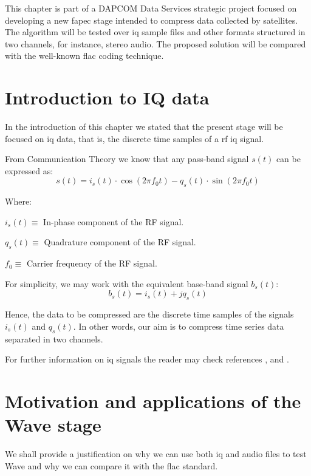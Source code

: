 This chapter is part of a DAPCOM Data Services strategic project focused on developing a new \acrshort{fapec} stage intended to compress data collected by satellites. The algorithm will be tested over \acrshort{iq} sample files and other formats structured in two channels, for instance, stereo audio. The proposed solution will be compared with the well-known \acrshort{flac} coding technique.

\section{Introduction to IQ data} \label{sec:iq_data}
In the introduction of this chapter we stated that the present stage will be focused on \acrshort{iq} data, that is, the discrete time samples of a \acrshort{rf} \acrshort{iq} signal.

From Communication Theory we know that any pass-band signal $s(t)$ can be expressed as:
\begin{equation}
s(t) = i_s(t) \cdot \cos(2\pi f_0 t) - q_s(t) \cdot \sin(2\pi f_0 t)
\end{equation}

Where:
\begin{description}
	\item $i_s(t) \equiv$ In-phase component of the RF signal.
	\item $q_s(t) \equiv$ Quadrature component of the RF signal.
	\item $f_0 \equiv$ Carrier frequency of the RF signal.
\end{description}

For simplicity, we may work with the equivalent base-band signal $b_s(t)$:
\begin{equation}
	b_s(t) = i_s(t) + j q_s(t)
\end{equation}

Hence, the data to be compressed are the discrete time samples of the signals $i_s(t)$ and $q_s(t)$. In other words, our aim is to compress time series data separated in two channels.

For further information on \acrshort{iq} signals the reader may check references \parencite{IQintro}, \parencite{carlson2010communication} and \parencite{ICOM}.

\section{Motivation and applications of the Wave stage} \label{sec:wave_motivation}
We shall provide a justification on why we can use both \acrshort{iq} and audio files to test Wave and why we can compare it with the \acrshort{flac} standard.

